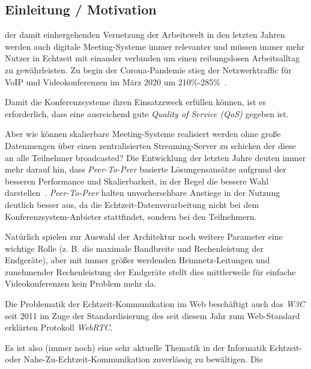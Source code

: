 \documentclass{article}
\begin{document}
\begin{onecolumn}

\section{Einleitung / Motivation}

der damit einhergehenden Vernetzung der Arbeitswelt in den letzten
Jahren~\cite{CoronaHomeOffice} werden auch digitale Meeting-Systeme immer
relevanter und müssen immer mehr Nutzer in Echtzeit mit einander verbinden um
einen reibungslosen Arbeitsalltag zu gewährleisten. Zu begin der
Corona-Pandemie stieg der Netzwerktraffic für VoIP und Videokonferenzen im März
2020 um 210\%-285\%~\cite{NetzwerkStatistik}.

Damit die Konferenzsysteme ihren Einsatzzweck erfüllen können, ist es
erforderlich, dass eine ausreichend gute \textit{Quality of Service (QoS)}
gegeben ist.

Aber wie können skalierbare Meeting-Systeme realisiert werden ohne große
Datenmengen über einen zentralisierten Streaming-Server zu schicken der diese
an alle Teilnehmer broadcasted? Die Entwicklung der letzten Jahre deuten immer
mehr darauf hin, dass \textit{Peer-To-Peer} basierte Lösungensansätze aufgrund
der besseren Performance und Skalierbarkeit, in der Regel die bessere Wahl
darstellen~\cite{PeerToPeerVersusCentralized}. \textit{Peer-To-Peer} halten
unvorhersehbare Anstiege in der Nutzung~\cite{NetzwerkStatistik} deutlich
besser aus, da die Echtzeit-Datenverarbeitung nicht bei dem
Konferenzsystem-Anbieter stattfindet, sondern bei den Teilnehmern.

Natürlich spielen zur Auswahl der Architektur noch weitere Parameter eine
wichtige Rolle (z. B. die maximale Bandbreite und Rechenleistung der
Endgeräte), aber mit immer größer werdenden Heimnetz-Leitungen und zunehmender
Rechenleistung der Endgeräte stellt dies mittlerweile für einfache
Videokonferenzen kein Problem mehr da.~\cite{VideokonferenzNetzwerklast}

Die Problematik der Echtzeit-Kommunikation im Web beschäftigt auch
das \textit{W3C} seit 2011 im Zuge der Standardisierung des seit diesem Jahr
zum Web-Standard erklärten Protokoll \textit{WebRTC}.~\cite{WebRTCStandardW3C}

Es ist also (immer noch) eine sehr aktuelle Thematik in der Informatik
Echtzeit- oder Nahe-Zu-Echtzeit-Kommunikation zuverlässig zu bewältigen. Die


\end{onecolumn}
\end{document}
